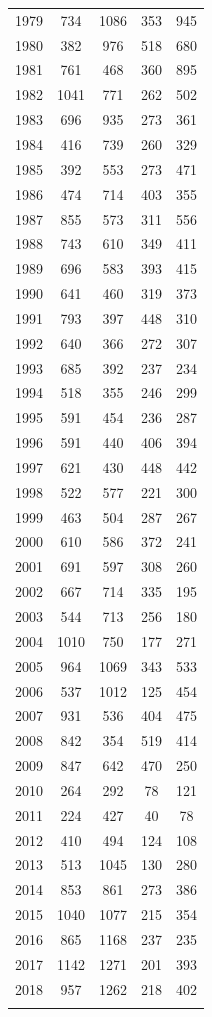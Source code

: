 \documentclass[12pt,]{article}
\begin{document}
\begin{center}
\begin{longtable}{ccccc}
  1979 & 734 & 1086 & 353 & 945 \\ 
  1980 & 382 & 976 & 518 & 680 \\ 
  1981 & 761 & 468 & 360 & 895 \\ 
  1982 & 1041 & 771 & 262 & 502 \\ 
  1983 & 696 & 935 & 273 & 361 \\ 
  1984 & 416 & 739 & 260 & 329 \\ 
  1985 & 392 & 553 & 273 & 471 \\ 
  1986 & 474 & 714 & 403 & 355 \\ 
  1987 & 855 & 573 & 311 & 556 \\ 
  1988 & 743 & 610 & 349 & 411 \\ 
  1989 & 696 & 583 & 393 & 415 \\ 
  1990 & 641 & 460 & 319 & 373 \\ 
  1991 & 793 & 397 & 448 & 310 \\ 
  1992 & 640 & 366 & 272 & 307 \\ 
  1993 & 685 & 392 & 237 & 234 \\ 
  1994 & 518 & 355 & 246 & 299 \\ 
  1995 & 591 & 454 & 236 & 287 \\ 
  1996 & 591 & 440 & 406 & 394 \\ 
  1997 & 621 & 430 & 448 & 442 \\ 
  1998 & 522 & 577 & 221 & 300 \\ 
  1999 & 463 & 504 & 287 & 267 \\ 
  2000 & 610 & 586 & 372 & 241 \\ 
  2001 & 691 & 597 & 308 & 260 \\ 
  2002 & 667 & 714 & 335 & 195 \\ 
  2003 & 544 & 713 & 256 & 180 \\ 
  2004 & 1010 & 750 & 177 & 271 \\ 
  2005 & 964 & 1069 & 343 & 533 \\ 
  2006 & 537 & 1012 & 125 & 454 \\ 
  2007 & 931 & 536 & 404 & 475 \\ 
  2008 & 842 & 354 & 519 & 414 \\ 
  2009 & 847 & 642 & 470 & 250 \\ 
  2010 & 264 & 292 & 78 & 121 \\ 
  2011 & 224 & 427 & 40 & 78 \\ 
  2012 & 410 & 494 & 124 & 108 \\ 
  2013 & 513 & 1045 & 130 & 280 \\ 
  2014 & 853 & 861 & 273 & 386 \\ 
  2015 & 1040 & 1077 & 215 & 354 \\ 
  2016 & 865 & 1168 & 237 & 235 \\ 
  2017 & 1142 & 1271 & 201 & 393 \\ 
  2018 & 957 & 1262 & 218 & 402 \\ 
   \hline
\hline
\label{tab:Comm_Catch}
\end{longtable}
\end{center}
\end{document}
